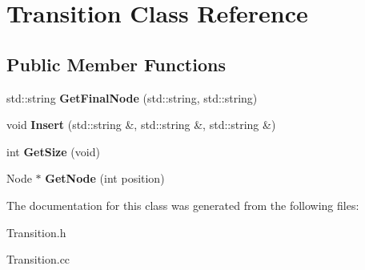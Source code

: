\hypertarget{classTransition}{}\section{Transition Class Reference}
\label{classTransition}
\subsection*{Public Member Functions}
\begin{DoxyCompactItemize}
\item 
\mbox{\label{classTransition_abf32adbb5c39d5a69f8540620f5e2e8c}} 
std\+::string {\bfseries Get\+Final\+Node} (std\+::string, std\+::string)
\item 
\mbox{\label{classTransition_adc99d2c2e431cb989e34abea83f71377}} 
void {\bfseries Insert} (std\+::string \&, std\+::string \&, std\+::string \&)
\item 
\mbox{\label{classTransition_a2f19d29c76337e2b65be2b3a46719963}} 
int {\bfseries Get\+Size} (void)
\item 
\mbox{\label{classTransition_a740aa42116d5264e2c16dd7a20a833cf}} 
Node $\ast$ {\bfseries Get\+Node} (int position)
\end{DoxyCompactItemize}


The documentation for this class was generated from the following files\+:\begin{DoxyCompactItemize}
\item 
Transition.\+h\item 
Transition.\+cc\end{DoxyCompactItemize}
